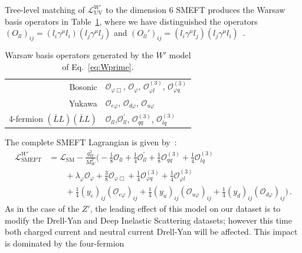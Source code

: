 \documentclass[withindex,glossary]{cam-thesis}
\begin{document}
Tree-level matching of $\mathcal{L}^{W'}_{\text{UV}}$ to the dimension 6 SMEFT produces the Warsaw basis operators in Table~\ref{tab:Wpops}, where we
have distinguished the operators
$(O_{ll})_{ij} = (l_{i} \gamma^{\mu} l_{i})(l_{j} \gamma^{\mu} l_{j})$ and $(O_{ll}')_{ij} = (l_{i} \gamma^{\mu} l_{j})(l_{j} \gamma^{\mu} l_{i})$~\cite{Brivio:2017vri}. 
%
\begin{table}[H]
\begin{center}
\begin{tabular}{ |r|l| }
 \hline
	Bosonic &  $\mathcal{O}_{\varphi \Box}$, $\mathcal{O}_{\varphi}$, $\mathcal{O}_{\varphi l}^{(3)}$, $\mathcal{O}_{\varphi q}^{(3)}$\\
	Yukawa & $\mathcal{O}_{e \varphi}$, $\mathcal{O}_{d \varphi}$, $\mathcal{O}_{u \varphi}$ \\
	4-fermion $(\bar{L} L)(\bar{L} L)$ & $\mathcal{O}_{ll}$,$\mathcal{O}_{ll}^{'}$, $\mathcal{O}_{qq}^{(3)}$, $\mathcal{O}_{lq}^{(3)}$ \\
 \hline
\end{tabular}
\end{center}
        \caption{\label{tab:Wpops} Warsaw basis operators generated by the $W'$ model of Eq.~\eqref{eq:Wprime}.}
\end{table}
%
The complete SMEFT Lagrangian is given by~\cite{deBlas:2017xtg}:
\begin{equation} 
\label{eq:WprimeEFT}
        \begin{split}
		\mathcal{L}^{W'}_{\text{SMEFT}} &= \mathcal{L}_{\text{SM}} - \frac{g_{W}^{2}}{M_{W}^{2}} \Big(- \frac{1}{8} \mathcal{O}_{ll} + \frac{1}{4} \mathcal{O}_{ll}^{'} + \frac{1}{8} \mathcal{O}_{qq}^{(3)} + \frac{1}{4} \mathcal{O}_{lq}^{(3)}\\
		&\qquad+ \lambda_{\varphi} \mathcal{O}_{\varphi} + \frac{3}{8} \mathcal{O}_{\varphi \Box}+ \frac{1}{4} \mathcal{O}_{\varphi q}^{(3)}  + \frac{1}{4} \mathcal{O}_{\varphi l}^{(3)}     \\
		&\qquad + \frac{1}{4} (y_{e})_{ij} (\mathcal{O}_{e \varphi})_{ij} + \frac{1}{4} (y_{u})_{ij} (\mathcal{O}_{u \varphi})_{ij} + \frac{1}{4} (y_{d})_{ij} (\mathcal{O}_{d \varphi})_{ij} \Big) \, . 
	\end{split}
\end{equation}
%
As in the case of the $Z'$, 
the leading effect of this model on our dataset 
is to modify the Drell-Yan and Deep Inelastic Scattering datasets; however this time both charged current and neutral current Drell-Yan will
be affected.  
This impact is dominated by the four-fermion
\end{document}
